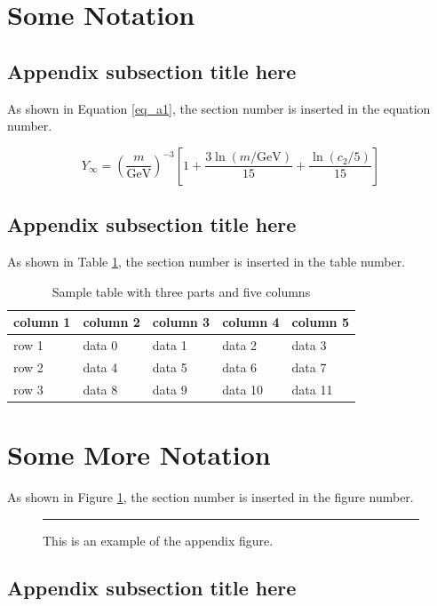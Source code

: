 \documentclass[12pt,a4paper]{article}
\begin{document}
\begin{appendices}

\section{Some Notation}
\lipsum[10]

\subsection{Appendix subsection title here}
As shown in Equation \ref{eq_a1}, the section number is inserted in the equation number.
\lipsum[11]

\begin{equation}
Y_\infty = \left( \frac{m}{\textrm{GeV}} \right)^{-3}
    \left[ 1 + \frac{3 \ln(m/\textrm{GeV})}{15}
    + \frac{\ln(c_2/5)}{15} \right]
\label{eq_a1}
\end{equation}

\subsection{Appendix subsection  title here}
As shown in Table \ref{tab_a1}, the section number is inserted in the table number.
\lipsum[12]

\begin{table}[!ht]
\caption{Sample table with three parts and five columns\label{tab_a1}}
\begin{threeparttable}
\begin{tabular*}{\columnwidth}{@{\extracolsep\fill}lllll@{\extracolsep\fill}}
\toprule
column 1 & column 2 & column 3 & column 4 & column 5\\
\midrule
row 1 & data 0 & data 1 & data 2 & data 3 \\
row 2 & data 4 & data 5 & data 6 & data 7 \\
row 3 & data 8 & data 9 & data 10 & data 11\\
\bottomrule
\end{tabular*}
\end{threeparttable}
\end{table}

\section{Some More Notation}

As shown in Figure \ref{fig_a1}, the section number is inserted in the figure number.
\lipsum[13]

\begin{figure}[!ht]%
\centering
{\color{black!20}\rule{420pt}{74pt}}
\caption{This is an example of the appendix figure.}\label{fig_a1}
\end{figure}

\subsection{Appendix subsection title here}
\lipsum[14]

\end{appendices}
\end{document}
